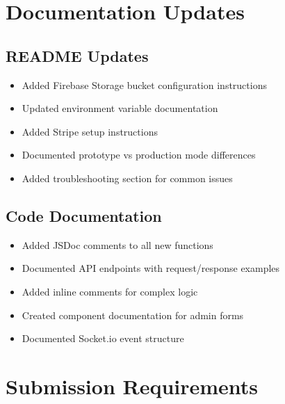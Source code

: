 \documentclass[11pt]{article}
\begin{document}
\section{Documentation Updates}

\subsection{README Updates}
\begin{itemize}[leftmargin=1.4em]
  \item Added Firebase Storage bucket configuration instructions
  \item Updated environment variable documentation
  \item Added Stripe setup instructions
  \item Documented prototype vs production mode differences
  \item Added troubleshooting section for common issues
\end{itemize}

\subsection{Code Documentation}
\begin{itemize}[leftmargin=1.4em]
  \item Added JSDoc comments to all new functions
  \item Documented API endpoints with request/response examples
  \item Added inline comments for complex logic
  \item Created component documentation for admin forms
  \item Documented Socket.io event structure
\end{itemize}

\section{Submission Requirements}
\end{document}
